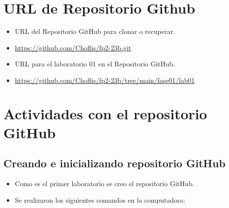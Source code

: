 \documentclass{article}
\begin{document}
	\section{URL de Repositorio Github}
	\begin{itemize}
		\item URL del Repositorio GitHub para clonar o recuperar.
		\item \url{https://github.com/Choflis/fp2-23b.git}
		\item URL para el laboratorio 01 en el Repositorio GitHub.
		\item \url{https://github.com/Choflis/fp2-23b/tree/main/fase01/lab01}
	\end{itemize}
	
	\section{Actividades con el repositorio GitHub}
	
	\subsection{Creando e inicializando repositorio GitHub}
	\begin{itemize}	
		\item Como es el primer laboratorio se creo el repositorio GitHub.
		\item Se realizaron los siguientes comandos en la computadora:
	\end{itemize}	
		
\end{document}
